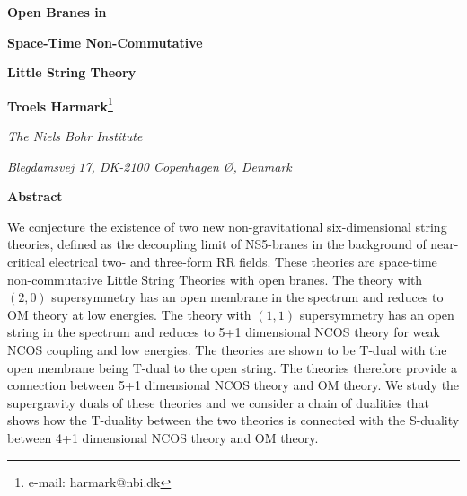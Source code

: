 \documentclass[a4paper,twoside,titlepage,12pt]{article}
\begin{document}
\begin{titlepage}

\vskip 2cm

\centerline{\Large \bf Open Branes in}
\vskip 0.2cm
\centerline{\Large \bf Space-Time Non-Commutative}
\vskip 0.2cm
\centerline{\Large \bf Little String Theory}
\vskip 0.2cm

\vskip 1.7cm
\centerline{{\bf Troels Harmark}\footnote{e-mail: harmark@nbi.dk}}
\vskip 0.3cm
\centerline{\sl The Niels Bohr Institute}
\centerline{\sl Blegdamsvej 17, DK-2100 Copenhagen \O, Denmark}
\vskip 1.7cm
\centerline{\bf Abstract}
\vskip 0.4cm

\noindent

We conjecture the existence of two new non-gravitational
six-dimensional string theories, defined as the decoupling limit
of NS5-branes in the background of near-critical electrical 
two- and three-form RR fields.
These theories are space-time non-commutative Little String Theories 
with open branes.
The theory with $(2,0)$ supersymmetry has an open membrane
in the spectrum and reduces to OM theory at low energies.
The theory with $(1,1)$ supersymmetry has an open string 
in the spectrum and reduces to 5+1 dimensional NCOS theory for 
weak NCOS coupling and low energies.
The theories are shown to be T-dual with
the open membrane being T-dual to the open string.
The theories therefore provide a connection 
between 5+1 dimensional NCOS theory and OM theory.
We study the supergravity duals of these theories and
we consider a chain of dualities that shows how the T-duality
between the two theories is connected with the S-duality between
4+1 dimensional NCOS theory and OM theory.


\end{titlepage}


\newcommand{\nn}{\nonumber}
\newcommand{\spa}{\ \ ,\ \ \ \ }
\newcommand{\str}{\mathop{{\rm Str}}}
\newcommand{\tr}{\mathop{{\rm Tr}}}
\newcommand{\sn}{\mathop{{\rm sn}}}

\newcommand{\gym}{g_{\mathrm{YM}}}
\newcommand{\geff}{g_{\mathrm{eff}}}
\newcommand{\gseff}{g_s^{\mathrm{eff}}}
\newcommand{\Ord}{{\cal{O}}}
\newcommand{\tlst}{T_{\rm LST}}
\newcommand{\tncos}{T_{\rm NCOS}}
\newcommand{\lsb}{\bar{l}_s}
\newcommand{\gsba}{\bar{g}_a}
\newcommand{\gsbb}{\bar{g}_b}
\newcommand{\lsn}{l_s}
\newcommand{\gsna}{g_a}
\newcommand{\gsnb}{g_b}
\newcommand{\lnc}{l_{\rm nc}}
\newcommand{\lm}{l_m}
\newcommand{\uncos}{u_{\rm NCOS}}
\end{document}
